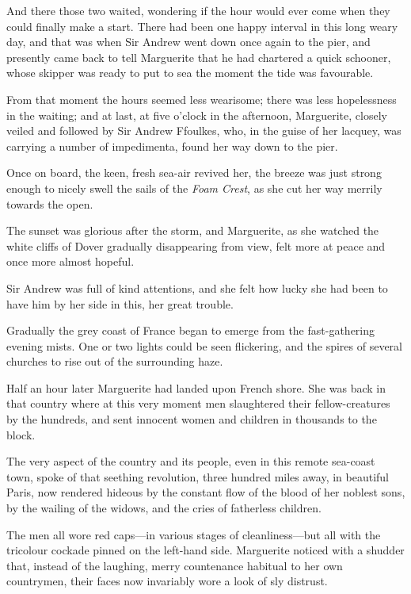 And there those two waited, wondering if the hour would ever come when they could finally make a start. There had been one happy interval in this long weary day, and that was when Sir Andrew went down once again to the pier, and presently came back to tell Marguerite that he had chartered a quick schooner, whose skipper was ready to put to sea the moment the tide was favourable.

From that moment the hours seemed less wearisome; there was less hopelessness in the waiting; and at last, at five o'clock in the afternoon, Marguerite, closely veiled and followed by Sir Andrew Ffoulkes, who, in the guise of her lacquey, was carrying a number of impedimenta, found her way down to the pier.

Once on board, the keen, fresh sea-air revived her, the breeze was just strong enough to nicely swell the sails of the \textit{Foam Crest}, as she cut her way merrily towards the open.

The sunset was glorious after the storm, and Marguerite, as she watched the white cliffs of Dover gradually disappearing from view, felt more at peace and once more almost hopeful.

Sir Andrew was full of kind attentions, and she felt how lucky she had been to have him by her side in this, her great trouble.

Gradually the grey coast of France began to emerge from the fast-gathering evening mists. One or two lights could be seen flickering, and the spires of several churches to rise out of the surrounding haze.

Half an hour later Marguerite had landed upon French shore. She was back in that country where at this very moment men slaughtered their fellow-creatures by the hundreds, and sent innocent women and children in thousands to the block.

The very aspect of the country and its people, even in this remote sea-coast town, spoke of that seething revolution, three hundred miles away, in beautiful Paris, now rendered hideous by the constant flow of the blood of her noblest sons, by the wailing of the widows, and the cries of fatherless children.

The men all wore red caps---in various stages of  cleanliness---but all with the tricolour cockade pinned on the left-hand side. Marguerite noticed with a shudder that, instead of the laughing, merry countenance habitual to her own countrymen, their faces now invariably wore a look of sly distrust.

